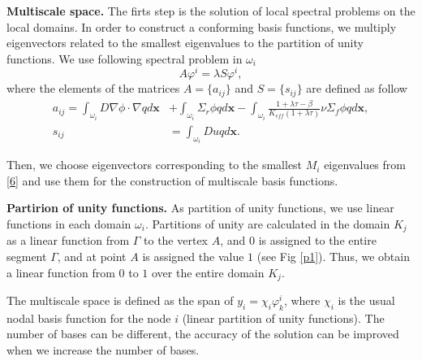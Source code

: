 \documentclass[runningheads]{llncs}
\begin{document}
\textbf{Multiscale space.}
The firts step is the solution of local spectral problems on the local domains.  
In order to construct a conforming basis functions, we multiply eigenvectors related to the smallest eigenvalues to the partition of unity functions.
We use following spectral problem in $\omega_i$
\begin{equation} \label{6}
A \varphi^i = \lambda S \varphi^i,
\end{equation} 
where the elements of the matrices $A= \{ a_{ij} \}$ and $S = \{ s_{ij} \}$ are defined as follow{
\begin{equation} \label{7}
\begin{split}
a_{ij} = 
\int_{\omega_i} D \nabla\phi \cdot \nabla q d\bm x &+ 
\int_{\omega_i} \Sigma_r \phi q d\bm x - 
\int_{\omega_i} \frac{1+\lambda\tau-\beta}{K_{eff}(1+\lambda\tau)} \nu \Sigma_f \phi q d\bm x, \\
s_{ij} &= \int_{\omega _i} D u q d\bm x.
\end{split}
\end{equation}}

{Then, we choose eigenvectors corresponding to the smallest $M_{i}$ eigenvalues from \eqref{6} and use them for the construction of multiscale basis functions.} 

\textbf{Partirion of unity functions. } As  partition of unity functions, we use linear functions in each domain $\omega_i$.
Partitions of unity are calculated in the domain $ K_j $ as a linear function from $\Gamma$ to the vertex $ A $, and $ 0 $ is assigned to the entire segment $\Gamma$, and at point $ A $ is assigned the value $1$ (see Fig \ref{p1}). 
Thus, we obtain a linear function from $ 0 $ to $ 1 $ over the entire domain $ K_j $. 
%
 
The multiscale space is defined as the span of $y_i = \chi_i \varphi^i_k$, where $\chi_i$ is the usual nodal basis function for the node $i$ (linear partition of unity functions). 
The number of bases can be different, the accuracy of the solution can be improved when we increase the number of bases.
\end{document}

